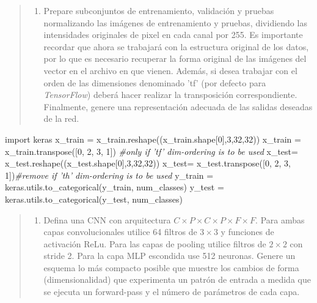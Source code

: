 \documentclass[11pt]{article}
\providecommand{\tightlist}{%
      \setlength{\itemsep}{0pt}\setlength{\parskip}{0pt}}
\newenvironment{Shaded}{}{}
\newcommand{\DecValTok}[1]{\textcolor[rgb]{0.25,0.63,0.44}{{#1}}}
\newcommand{\CommentTok}[1]{\textcolor[rgb]{0.38,0.63,0.69}{\textit{{#1}}}}
\newcommand{\NormalTok}[1]{{#1}}
\newcommand{\ImportTok}[1]{{#1}}
\newcommand{\OperatorTok}[1]{\textcolor[rgb]{0.40,0.40,0.40}{{#1}}}
\begin{document}
\begin{quote}
\begin{enumerate}
\def\labelenumi{\alph{enumi})}
\setcounter{enumi}{1}
\tightlist
\item
  Prepare subconjuntos de entrenamiento, validación y pruebas
  normalizando las imágenes de entrenamiento y pruebas, dividiendo las
  intensidades originales de pixel en cada canal por 255. Es importante
  recordar que ahora se trabajará con la estructura original de los
  datos, por lo que es necesario recuperar la forma original de las
  imágenes del vector en el archivo en que vienen. Además, si desea
  trabajar con el orden de las dimensiones denominado 'tf' (por defecto
  para \emph{TensorFlow}) deberá hacer realizar la transposición
  correspondiente. Finalmente, genere una representación adecuada de las
  salidas deseadas de la red.
\end{enumerate}
\end{quote}

\begin{Shaded}
\begin{Highlighting}[]
\ImportTok{import}\NormalTok{ keras}
\NormalTok{x_train }\OperatorTok{=}\NormalTok{ x_train.reshape((x_train.shape[}\DecValTok{0}\NormalTok{],}\DecValTok{3}\NormalTok{,}\DecValTok{32}\NormalTok{,}\DecValTok{32}\NormalTok{))}
\NormalTok{x_train }\OperatorTok{=}\NormalTok{ x_train.transpose([}\DecValTok{0}\NormalTok{, }\DecValTok{2}\NormalTok{, }\DecValTok{3}\NormalTok{, }\DecValTok{1}\NormalTok{]) }\CommentTok{#only if 'tf' dim-ordering is to be used}
\NormalTok{x_test}\OperatorTok{=}\NormalTok{ x_test.reshape((x_test.shape[}\DecValTok{0}\NormalTok{],}\DecValTok{3}\NormalTok{,}\DecValTok{32}\NormalTok{,}\DecValTok{32}\NormalTok{))}
\NormalTok{x_test}\OperatorTok{=}\NormalTok{ x_test.transpose([}\DecValTok{0}\NormalTok{, }\DecValTok{2}\NormalTok{, }\DecValTok{3}\NormalTok{, }\DecValTok{1}\NormalTok{])}\CommentTok{#remove if 'th' dim-ordering is to be used}
\NormalTok{y_train }\OperatorTok{=}\NormalTok{ keras.utils.to_categorical(y_train, num_classes)}
\NormalTok{y_test }\OperatorTok{=}\NormalTok{ keras.utils.to_categorical(y_test, num_classes)}
\end{Highlighting}
\end{Shaded}

\begin{quote}
\begin{enumerate}
\def\labelenumi{\alph{enumi})}
\setcounter{enumi}{2}
\tightlist
\item
  Defina una CNN con arquitectura
  \(C \times P \times C \times P \times F \times F\). Para ambas capas
  convolucionales utilice 64 filtros de \(3 \times 3\) y funciones de
  activación ReLu. Para las capas de pooling utilice filtros de
  \(2 \times 2\) con stride 2. Para la capa MLP escondida use 512
  neuronas. Genere un esquema lo más compacto posible que muestre los
  cambios de forma (dimensionalidad) que experimenta un patrón de
  entrada a medida que se ejecuta un forward-pass y el número de
  parámetros de cada capa.
\end{enumerate}
\end{quote}
\end{document}
